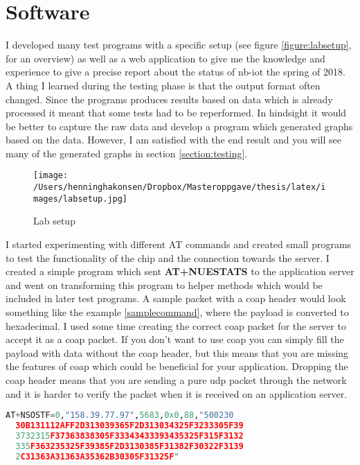\documentclass[USenglish]{ifimaster}  %
\begin{document}
\section{Software}
I developed many test programs with a specific setup (see figure \vref{figure:labsetup}, for an overview) as well as a web application to give me the knowledge and experience to give a precise report about the status of \acrshort{nb-iot} the spring of 2018. A thing I learned during the testing phase is that the output format often changed. Since the programs produces results based on data which is already processed it meant that some tests had to be reperformed. In hindsight it would be better to capture the raw data and develop a program which generated graphs based on the data. However, I am satisfied with the end result and you will see many of the generated graphs in section \vref{section:testing}.

\begin{figure}[ht]
  \centering\texttt{[image: /Users/henninghakonsen/Dropbox/Masteroppgave/thesis/latex/images/labsetup.jpg]}
  \caption[Lab setup overview]{Lab setup \cite{pcpng35052:online} \cite{fluke88435:online} \cite{ingagrue31:online}}
  \label{figure:labsetup}
\end{figure}

I started experimenting with different AT commands and created small programs to test the functionality of the chip and the connection towards the server. I created a simple program which sent \textbf{AT+NUESTATS} to the application server and went on transforming this program to helper methods which would be included in later test programs. A sample packet with a \acrshort{coap} header would look something like the example \vref{samplecommand}, where the payload is converted to hexadecimal. I used some time creating the correct \acrshort{coap} packet for the server to accept it as a \acrshort{coap} packet. If you don't want to use \acrshort{coap} you can simply fill the payload with data without the \acrshort{coap} header, but this means that you are missing the features of \acrshort{coap} which could be beneficial for your application. Dropping the \acrshort{coap} header means that you are sending a pure \acrshort{udp} packet through the network and it is harder to verify the packet when it is received on an application server.

\begin{lstlisting}[caption={\acrshort{nb-iot} sample transmit},label={samplecommand},language=Python]
  AT+NSOSTF=0,"158.39.77.97",5683,0x0,88,"500230
  30B131112AFF2D313039365F2D313034325F3233305F39
  3732315F37363838305F33343433393435325F315F3132
  335F363235325F39385F2D3130385F31382F30322F3139
  2C31363A31363A35362B30305F31325F"
\end{lstlisting}
\end{document}
